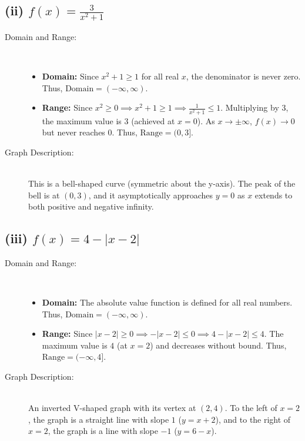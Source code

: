 \documentclass[11pt, a4paper]{article}
\begin{document}
\subsection*{(ii) $f(x) = \frac{3}{x^2+1}$}
\begin{description}
    \item[Domain and Range:] \ 
    \begin{itemize}
        \item \textbf{Domain:} Since $x^2 + 1 \ge 1$ for all real $x$, the denominator is never zero. Thus, $\text{Domain} = (-\infty, \infty)$.
        \item \textbf{Range:} Since $x^2 \ge 0 \implies x^2 + 1 \ge 1 \implies \frac{1}{x^2 + 1} \le 1$. Multiplying by 3, the maximum value is $3$ (achieved at $x = 0$). As $x \to \pm \infty$, $f(x) \to 0$ but never reaches $0$. Thus, $\text{Range} = (0, 3]$.
    \end{itemize}
    \item[Graph Description:] \ \\
    This is a bell-shaped curve (symmetric about the y-axis). The peak of the bell is at $(0, 3)$, and it asymptotically approaches $y = 0$ as $x$ extends to both positive and negative infinity.
\end{description}

\subsection*{(iii) $f(x) = 4 - |x - 2|$}
\begin{description}
    \item[Domain and Range:] \ 
    \begin{itemize}
        \item \textbf{Domain:} The absolute value function is defined for all real numbers. Thus, $\text{Domain} = (-\infty, \infty)$.
        \item \textbf{Range:} Since $|x - 2| \ge 0 \implies -|x - 2| \le 0 \implies 4 - |x - 2| \le 4$. The maximum value is $4$ (at $x=2$) and decreases without bound. Thus, $\text{Range} = (-\infty, 4]$.
    \end{itemize}
    \item[Graph Description:] \ \\
    An inverted V-shaped graph with its vertex at $(2, 4)$. To the left of $x = 2$, the graph is a straight line with slope $1$ ($y = x + 2$), and to the right of $x = 2$, the graph is a line with slope $-1$ ($y = 6 - x$).
\end{description}
\end{document}
